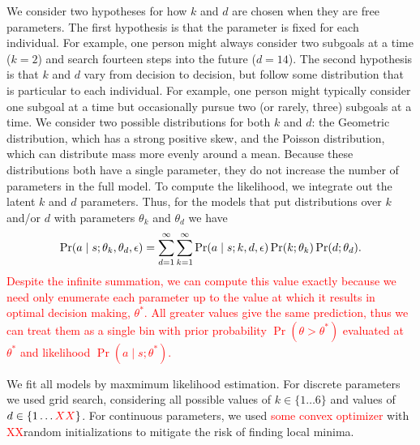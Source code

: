 \documentclass[10pt,letterpaper]{article}
\newcommand{\red}[1]{\textcolor{red}{#1}}
\newcommand{\MISSING}{\red{XX}}
\begin{document}
We consider two hypotheses for how $k$ and $d$ are chosen when they are free parameters. The first hypothesis is that the parameter is fixed for each individual. For example, one person might always consider two subgoals at a time ($k=2$)  and search fourteen steps into the future ($d=14$). The second hypothesis is that $k$ and $d$ vary from decision to decision, but follow some distribution that is particular to each individual. For example, one person might typically consider one subgoal at a time but occasionally pursue two (or rarely, three) subgoals at a time. We consider two possible distributions for both $k$ and $d$: the Geometric distribution, which has a strong positive skew, and the Poisson distribution, which can distribute mass more evenly around a mean. Because these distributions both have a single parameter, they do not increase the number of parameters in the full model. To compute the likelihood, we integrate out the latent $k$ and $d$ parameters. Thus, for the models that put distributions over $k$ and/or $d$ with parameters $\theta_k$ and $\theta_d$ we have
%
%
\red{%
\begin{equation}\label{eq:likelihood-dist}
  \Pr(a \mid s; \theta_k, \theta_d, \epsilon) = 
    \sum_{d=1}^{\infty} \sum_{k=1}^{\infty}
      \Pr(a \mid s; k, d, \epsilon) \Pr(k ; \theta_k) \Pr(d ; \theta_d) \\
.
\end{equation}
Despite the infinite summation, we can compute this value exactly because we need only enumerate each parameter up to the value at which it results in optimal decision making, $\theta^*$. All greater values give the same prediction, thus we can treat them as a single bin with prior probability $\Pr(\theta > \theta^*)$ evaluated at $\theta^*$ and likelihood  $\Pr(a \mid s; \theta^*)$.
}

We fit all models by maxmimum likelihood estimation. For discrete parameters we used grid search, considering all possible values of $k \in \{ 1 \dots 6 \}$ and values of $d \in \{1 \dots \MISSING \}$. For continuous parameters, we used \red{some convex optimizer} with \MISSING random initializations to mitigate the risk of finding local minima.
\end{document}
